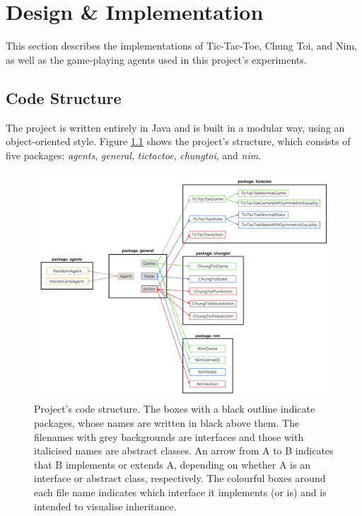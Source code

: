\documentclass[11pt,a4paper]{report}
\begin{document}
\chapter{Design \& Implementation}
\label{sec:DesignImpl}

This section describes the implementations of Tic-Tac-Toe, Chung Toi, and Nim, as well as the game-playing agents used in this project's experiments.


\section{Code Structure}

The project is written entirely in Java and is built in a modular way, using an object-oriented style. Figure \ref{code-structure} shows the project's structure, which consists of five packages: \emph{agents}, \emph{general}, \emph{tictactoe}, \emph{chungtoi}, and \emph{nim}.

\begin{figure}[htbp]
	\begin{center}
		\includegraphics[width=\linewidth]{code_structure.png}
		\caption{Project's code structure. The boxes with a black outline indicate packages, whose names are written in black above them. The filenames with grey backgrounds are interfaces and those with italicised names are abstract classes. An arrow from A to B indicates that B implements or extends A, depending on whether A is an interface or abstract class, respectively. The colourful boxes around each file name indicates which interface it implements (or is) and is intended to visualise inheritance.}
		\label{code-structure}
	\end{center}
\end{figure}
\end{document}
